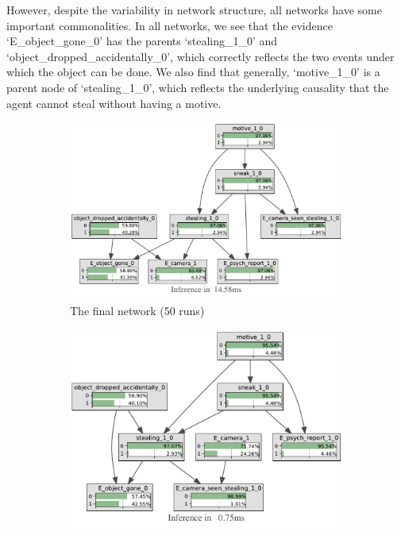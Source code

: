 \documentclass[12pt]{article}
\begin{document}
However, despite the variability in network structure, all networks have some important commonalities. In all networks, we see that the evidence `E\_object\_gone\_0' has the parents `stealing\_1\_0' and `object\_dropped\_accidentally\_0', which correctly reflects the two events under which the object can be done. We also find that generally, `motive\_1\_0' is a parent node of `stealing\_1\_0', which reflects the underlying causality that the agent cannot steal without having a motive.
 
\begin{figure}[htbp]
\begin{center}
\begin{subfigure}{0.45\textwidth}
\includegraphics[width=\linewidth]{GroteMarktPrivate/bnImage/BNIMAGEGroteMarktPrivate50.pdf}
\caption{The final network (50 runs)}
\end{subfigure}
\begin{subfigure}{0.45\textwidth}
\includegraphics[width=\linewidth]{GroteMarktPrivate/bnImage/BNIMAGEGroteMarktPrivate100.pdf}

\end{subfigure}
\end{center}
\end{figure}
\end{document}
